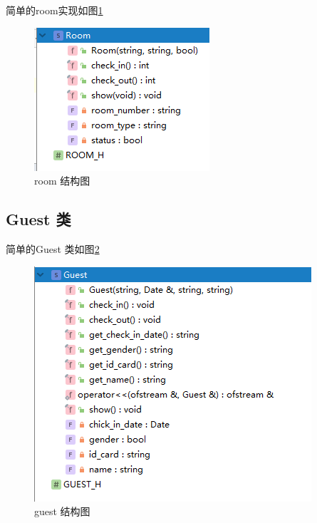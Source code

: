 \documentclass[UTF8]{ctexart}
\begin{document}
    简单的room实现如图\ref{fig:room}

      \begin{figure}[H]%
        \centering%
        \includegraphics[scale = 1]{structure_room.png}
        \caption{room 结构图}%
        \label{fig:room}
      \end{figure}

  \subsection{Guest 类}
    简单的Guest 类如图\ref{fig:structure_guest}
    \begin{figure}[H]
        \centering
        \includegraphics[scale = 1]{structure_guest}
        \caption{guest 结构图}
        \label{fig:structure_guest}
      \end{figure}
\end{document}
